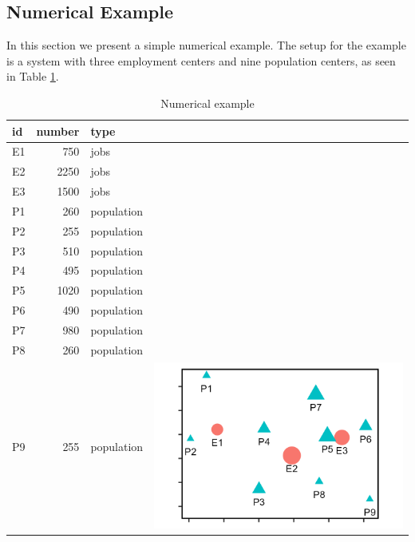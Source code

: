 \documentclass[]{elsarticle} %
\begin{document}
\hypertarget{numerical-example}{%
\subsection{Numerical Example}\label{numerical-example}}

In this section we present a simple numerical example. The setup for the
example is a system with three employment centers and nine population
centers, as seen in Table \ref{tab:toy-example}.

\begin{table}

\caption{\label{tab:toy-example-table}\label{tab:toy-example}Numerical example}
\centering
\begin{tabular}[t]{lrl>{}l}
\toprule
id & number & type & \\
\midrule
E1 & 750 & jobs & \\

E2 & 2250 & jobs & \\

E3 & 1500 & jobs & \\

P1 & 260 & population & \\

P2 & 255 & population & \\

P3 & 510 & population & \\

P4 & 495 & population & \\

P5 & 1020 & population & \\

P6 & 490 & population & \\

P7 & 980 & population & \\

P8 & 260 & population & \\

P9 & 255 & population & \multirow{-12}{*}{\raggedright\arraybackslash \includegraphics{images/figure-1.png}}\\
\bottomrule
\end{tabular}
\end{table}
\end{document}
